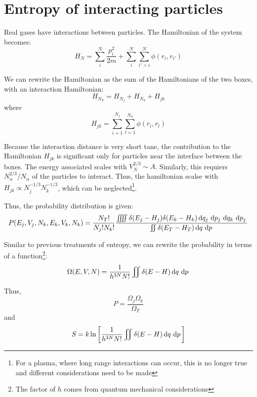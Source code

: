 \section{Entropy of interacting particles}
Real gases have interactions between particles. The Hamiltonian of the system becomes:
\begin{equation}
	H_{N} = \sum_i^{N}\frac{p^2_i}{2m} + \sum_i^{N}\sum_{i'>i}^{N}\phi(r_i, r_{i'})\label{eq5:boxhamiltonian}
\end{equation}

We can rewrite the Hamiltonian as the sum of the Hamiltonians of the two boxes, with an interaction Hamiltonian:
\begin{equation}
	H_{N_T}= H_{N_j} + H_{N_k} + H_{jk}
\end{equation}
where
\begin{equation}
	H_{jk} = \sum_{i=1}^{N_j}\sum_{l=1}^{N_k}\phi(r_i, r_l)\label{eq5:linkinghamiltonian}
\end{equation}

Because the interaction distance is very short tane, the contribution to the Hamiltonian \(H_{jk}\) is significant only for particles near the interface between the boxes. The energy associated scales with \(V_N^{2/3}\sim A\). Similarly, this requiers \(N_\alpha^{2/3}/N_\alpha\) of the particles to interact. Thus, the hamiltonian scalse with \(H_{jk}\propto N_j^{-1/3}N_k^{-1/3}\), which can be neglected\footnote{For a plasma, where long range interactions can occur, this is no longer true and different considerations need to be made}. 

Thus, the probability distribution is given:
\begin{equation}
	P(E_j, V_j, N_k, E_k, V_k, N_k)=\frac{N_T!}{N_j! N_k!}\frac{\iiiint \delta (E_j-H_j)\delta(E_k-H_k)\d{q_j}\d{p_j}\d{q_k}\d{p_j}}{\iint\delta(E_T-H_T)\d{q}\d{p}}
\end{equation}

Similar to previous treatments of entropy, we can rewrite the probability in terms of a function\footnote{The factor of \(h\) comes from quantum mechanical considerations}:
\begin{equation}
	\Omega(E,V,N) = \frac{1}{h^{3N}N!}\iint \delta(E-H)\d{q}\d{p}
\end{equation}

Thus,
\begin{equation}
	P = \frac{\Omega_j \Omega_k}{\Omega_T}
\end{equation}
and
\begin{equation}
	S = k\ln\left[\frac{1}{h^{3N}N!}\iint\delta(E-H)\d{q}\d{p}\right] 
\end{equation}

